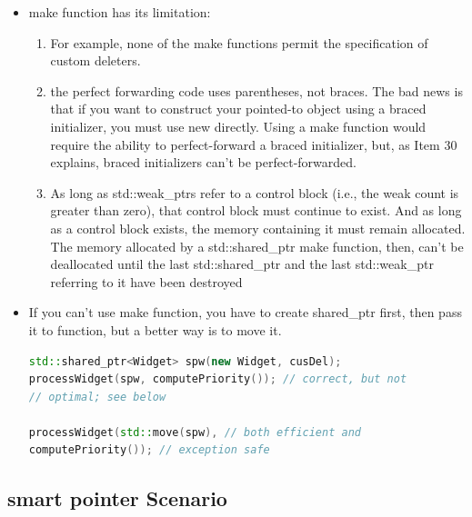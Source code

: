 \documentclass[a4paper,12pt,twoside]{book}
\begin{document}
\begin{itemize}
\item make function has its limitation:
\begin{enumerate}
\item For example, none of the make functions permit the specification of custom deleters.

\item the perfect forwarding code uses parentheses, not braces. The bad news is that if you want to construct your pointed-to object using a braced initializer, you must use new directly. Using a make function would require the ability to perfect-forward a braced initializer, but, as Item 30 explains, braced initializers can't be perfect-forwarded.

\item As long as std::weak\_ptrs refer to a control block (i.e., the weak count is greater
than zero), that control block must continue to exist. And as long as a control block
exists, the memory containing it must remain allocated. The memory allocated by a
std::shared\_ptr make function, then, can't be deallocated until the last
std::shared\_ptr and the last std::weak\_ptr referring to it have been destroyed
\end{enumerate}

\item If you can't use make function, you have to create shared\_ptr first, then pass it to function, but a better way is to move it.
\begin{lstlisting}[frame=single, language=c++]
std::shared_ptr<Widget> spw(new Widget, cusDel);
processWidget(spw, computePriority()); // correct, but not
// optimal; see below

processWidget(std::move(spw), // both efficient and
computePriority()); // exception safe
\end{lstlisting}

\end{itemize}


\subsection{smart pointer Scenario}
\end{document}
